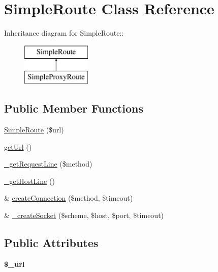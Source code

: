 \hypertarget{class_simple_route}{
\section{SimpleRoute Class Reference}
\label{class_simple_route}
}
Inheritance diagram for SimpleRoute::\begin{figure}[H]
\begin{center}
\leavevmode
\includegraphics[height=2cm]{class_simple_route}
\end{center}
\end{figure}
\subsection*{Public Member Functions}
\begin{DoxyCompactItemize}
\item 
\hyperlink{class_simple_route_aad5ce6e580494698a068f67ebf9c3c6e}{SimpleRoute} (\$url)
\item 
\hyperlink{class_simple_route_ac4c2ad3f89c50dd48d9bc66e828dac4c}{getUrl} ()
\item 
\hyperlink{class_simple_route_a7480c99e9ebcac13f1d84b4eb676f02d}{\_\-getRequestLine} (\$method)
\item 
\hyperlink{class_simple_route_af9b3205667c83b683a9636eaabc8f485}{\_\-getHostLine} ()
\item 
\& \hyperlink{class_simple_route_a686424eff035f1a37bbf13e997a072af}{createConnection} (\$method, \$timeout)
\item 
\& \hyperlink{class_simple_route_ad064d21e767491c8dd0e9a70ec2d1110}{\_\-createSocket} (\$scheme, \$host, \$port, \$timeout)
\end{DoxyCompactItemize}
\subsection*{Public Attributes}
\begin{DoxyCompactItemize}
\item 
\hypertarget{class_simple_route_a5fa56b19cb962b887b6c04e59784e64f}{
{\bfseries \$\_\-url}}
\label{class_simple_route_a5fa56b19cb962b887b6c04e59784e64f}

\end{DoxyCompactItemize}


